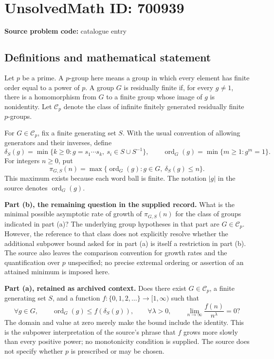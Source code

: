 \documentclass[11pt]{article}
\begin{document}
\section*{UnsolvedMath ID: 700939}
\textbf{Source problem code:} catalogue entry
\subsection{Definitions and mathematical statement}
Let \(p\) be a prime. A \(p\)-group here means a group in which every element has finite order equal to a power of \(p\). A group \(G\) is residually finite if, for every \(g\ne 1\), there is a homomorphism from \(G\) to a finite group whose image of \(g\) is nonidentity. Let \(\mathcal C_p\) denote the class of infinite finitely generated residually finite \(p\)-groups.

For \(G\in\mathcal C_p\), fix a finite generating set \(S\). With the usual convention of allowing generators and their inverses, define
\[
\delta_S(g)=\min\{k\geq 0:g=s_1\cdots s_k,\ s_i\in S\cup S^{-1}\},
\qquad
\operatorname{ord}_G(g)=\min\{m\geq 1:g^m=1\}.
\]
For integers \(n\geq 0\), put
\[
\pi_{G,S}(n)=\max\{\operatorname{ord}_G(g):g\in G,\ \delta_S(g)\leq n\}.
\]
This maximum exists because each word ball is finite. The notation \(|g|\) in the source denotes \(\operatorname{ord}_G(g)\).

\textbf{Part (b), the remaining question in the supplied record.} What is the minimal possible asymptotic rate of growth of \(\pi_{G,S}(n)\) for the class of groups indicated in part (a)? The underlying group hypotheses in that part are \(G\in\mathcal C_p\). However, the reference to that class does not explicitly resolve whether the additional subpower bound asked for in part (a) is itself a restriction in part (b). The source also leaves the comparison convention for growth rates and the quantification over \(p\) unspecified; no precise extremal ordering or assertion of an attained minimum is imposed here.

\textbf{Part (a), retained as archived context.} Does there exist \(G\in\mathcal C_p\), a finite generating set \(S\), and a function \(f:\{0,1,2,\ldots\}\to[1,\infty)\) such that
\[
\forall g\in G,\qquad \operatorname{ord}_G(g)\leq f(\delta_S(g)),
\qquad
\forall\lambda>0,\qquad
\lim_{n\to\infty}\frac{f(n)}{n^\lambda}=0?
\]
The domain and value at zero merely make the bound include the identity. This is the subpower interpretation of the source's phrase that \(f\) grows more slowly than every positive power; no monotonicity condition is supplied. The source does not specify whether \(p\) is prescribed or may be chosen.
\end{document}
